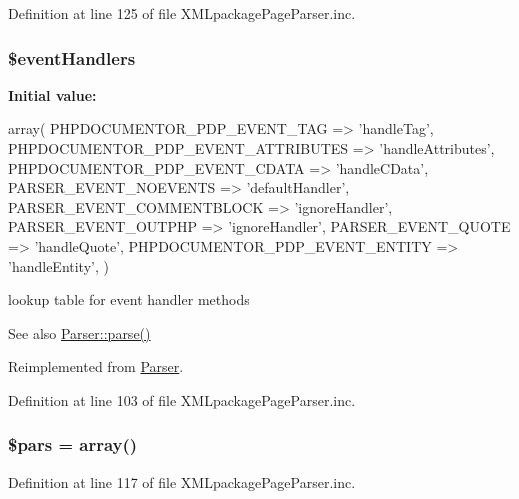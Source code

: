 \-Definition at line 125 of file \-X\-M\-Lpackage\-Page\-Parser.\-inc.

\hypertarget{class_x_m_l_package_page_parser_a430675102684e9ab820c7622678832b0}{
\subsubsection[{\$event\-Handlers}]{\setlength{\rightskip}{0pt plus 5cm}\$event\-Handlers}}\label{class_x_m_l_package_page_parser_a430675102684e9ab820c7622678832b0}
{\bfseries \-Initial value\-:}
\begin{DoxyCode}
 array(
        PHPDOCUMENTOR_PDP_EVENT_TAG => 'handleTag',
        PHPDOCUMENTOR_PDP_EVENT_ATTRIBUTES => 'handleAttributes',
        PHPDOCUMENTOR_PDP_EVENT_CDATA => 'handleCData',
        PARSER_EVENT_NOEVENTS => 'defaultHandler',
        PARSER_EVENT_COMMENTBLOCK => 'ignoreHandler',
        PARSER_EVENT_OUTPHP => 'ignoreHandler',
        PARSER_EVENT_QUOTE => 'handleQuote',
        PHPDOCUMENTOR_PDP_EVENT_ENTITY => 'handleEntity',
    )
\end{DoxyCode}
lookup table for event handler methods \begin{DoxySeeAlso}{\-See also}
\hyperlink{class_parser_a20139dbf0050f44b70e34bf32d89d7e4}{\-Parser\-::parse()} 
\end{DoxySeeAlso}


\-Reimplemented from \hyperlink{class_parser_a430675102684e9ab820c7622678832b0}{\-Parser}.



\-Definition at line 103 of file \-X\-M\-Lpackage\-Page\-Parser.\-inc.

\hypertarget{class_x_m_l_package_page_parser_ab8117573961eab022362e6fa8622ee1c}{
\subsubsection[{\$pars}]{\setlength{\rightskip}{0pt plus 5cm}\$pars = array()}}\label{class_x_m_l_package_page_parser_ab8117573961eab022362e6fa8622ee1c}


\-Definition at line 117 of file \-X\-M\-Lpackage\-Page\-Parser.\-inc.

